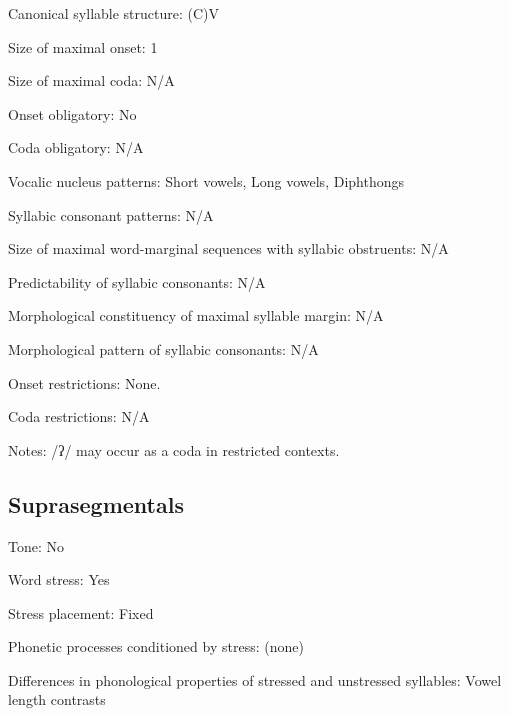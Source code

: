 {\begin{appendixdesc}
\item[Canonical syllable structure:] (C)V \citep[93--95]{Wojtylak2017}

\item[Size of maximal onset:] 1

\item[Size of maximal coda:] N/A

\item[Onset obligatory:] No

\item[Coda obligatory:] N/A

\item[Vocalic nucleus patterns:] Short vowels, Long vowels, Diphthongs

\item[Syllabic consonant patterns:] N/A

\item[Size of maximal word-marginal sequences with syllabic obstruents:] N/A

\item[Predictability of syllabic consonants:] N/A

\item[Morphological constituency of maximal syllable margin:] N/A

\item[Morphological pattern of syllabic consonants:] N/A

\item[Onset restrictions:] None.

\item[Coda restrictions:] N/A

\item[Notes:] /ʔ/ may occur as a coda in restricted contexts.
\end{appendixdesc}
\subsection*{Suprasegmentals}
\begin{appendixdesc}
\item[Tone:] No

\item[Word stress:] Yes

\item[Stress placement:] Fixed

\item[Phonetic processes conditioned by stress:] (none)

\item[Differences in phonological properties of stressed and unstressed syllables:] Vowel length contrasts


\end{appendixdesc}}
